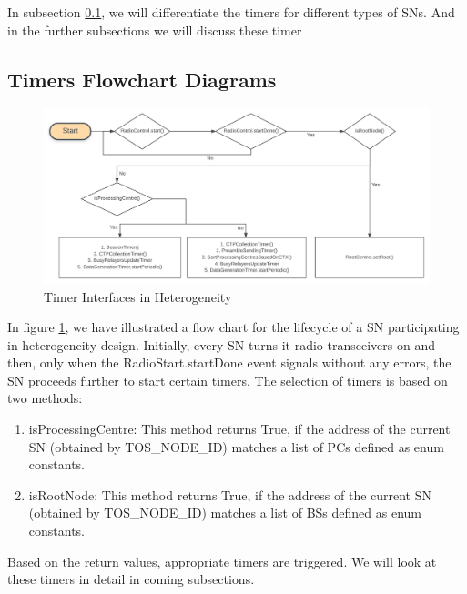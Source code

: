 	In subsection \ref{subsec:TimersFlowchartDiagrams}, we will differentiate the timers for different types of \acp{SN}. And in the further subsections we will discuss these timer

	\subsection{Timers Flowchart Diagrams}\label{subsec:TimersFlowchartDiagrams}
	
	\begin{figure}
    \centering
    \includegraphics[width=1.0\textwidth]{gfx/Flow_diagram_start.png}
    \caption{Timer Interfaces in Heterogeneity}
    \label{fig:TimerInterfaces}
    \end{figure}

	
	In figure \ref{fig:TimerInterfaces}, we have illustrated a flow chart for the lifecycle of a \ac{SN} participating in heterogeneity design. Initially, every \ac{SN} turns it radio transceivers on and then, only when the RadioStart.startDone event signals without any errors, the \ac{SN} proceeds further to start certain timers. The selection of timers is based on two methods:
	
	\begin{enumerate}
	    \item isProcessingCentre: This method returns True, if the address of the current \ac{SN} (obtained by TOS\_NODE\_ID) matches a list of \acp{PC} defined as enum constants.
	    
	    \item isRootNode: This method returns True, if the address of the current \ac{SN} (obtained by TOS\_NODE\_ID) matches a list of \acp{BS} defined as enum constants.
	\end{enumerate}
	
	Based on the return values, appropriate timers are triggered. We will look at these timers in detail in coming subsections.
	    	
